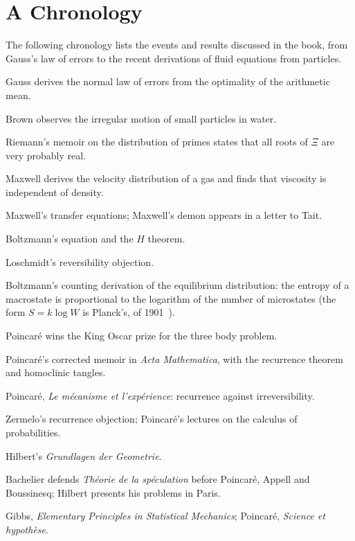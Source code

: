 \chapter{A Chronology}
\label{app:chronology}

The following chronology lists the events and results discussed in the book, from Gauss's law of errors to the recent derivations of fluid equations from particles.

\medskip
\begin{description}[leftmargin=3.2em,labelwidth=2.8em,labelsep=0.4em]
\item[1809] Gauss derives the normal law of errors from the optimality of the arithmetic mean.
\item[1827] Brown observes the irregular motion of small particles in water.
\item[1859] Riemann's memoir on the distribution of primes states that all roots of $\Xi$ are very probably real.
\item[1860] Maxwell derives the velocity distribution of a gas and finds that viscosity is independent of density.
\item[1867] Maxwell's transfer equations; Maxwell's demon appears in a letter to Tait.
\item[1872] Boltzmann's equation and the $H$ theorem.
\item[1876] Loschmidt's reversibility objection.
\item[1877] Boltzmann's counting derivation of the equilibrium distribution: the entropy of a macrostate is proportional to the logarithm of the number of microstates (the form $S = k\log W$ is Planck's, of 1901~\cite{planck1901}).
\item[1889] Poincar\'e wins the King Oscar prize for the three body problem.
\item[1890] Poincar\'e's corrected memoir in \emph{Acta Mathematica}, with the recurrence theorem and homoclinic tangles.
\item[1893] Poincar\'e, \emph{Le m\'ecanisme et l'exp\'erience}: recurrence against irreversibility.
\item[1896] Zermelo's recurrence objection; Poincar\'e's lectures on the calculus of probabilities.
\item[1899] Hilbert's \emph{Grundlagen der Geometrie}.
\item[1900] Bachelier defends \emph{Th\'eorie de la sp\'eculation} before Poincar\'e, Appell and Boussinesq; Hilbert presents his problems in Paris.
\item[1902] Gibbs, \emph{Elementary Principles in Statistical Mechanics}; Poincar\'e, \emph{Science et hypoth\`ese}.

\end{description}
